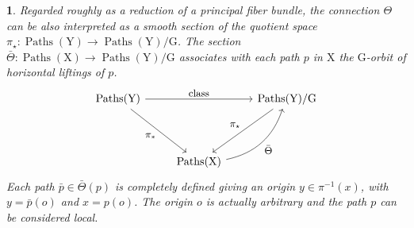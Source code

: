 \documentclass[12pt,reqno]{amsart}
\theoremstyle{article}
\newtheorem{article}{}
\def \G{\mathrm G}
\def \X{\mathrm X}
\def \Y{\mathrm Y}
\newcommand{\class}{\mathrm{class}}
\DeclareMathOperator{\Paths}{Paths}
\begin{document}
\begin{article}
    Regarded roughly as a reduction of a principal fiber bundle,
    the connection $\Theta$ can be also interpreted as a smooth section of the quotient space $\pi_\star \colon  \Paths(\Y) \to \Paths(\Y)/\G$.
    The section $\bar\Theta \colon \Paths(\X) \to \Paths(\Y)/\G$ associates with each path $p$ in $\X$ the $\G$-orbit of horizontal liftings of $p$.
    $$
    \begin{tikzcd}[column sep=normal,every label/.append style = {font = \small}]
      \Paths(\Y)  \arrow[rr, "\class"] \arrow[rd, swap, "\pi_*"] &    & \Paths(\Y)/\G \arrow[dl,swap, "\pi_\star"] \\[.75cm]
      & \Paths(\X) \arrow[bend right=30, swap, ur, "\bar\Theta"]  &
    \end{tikzcd}
    $$
    Each path $\bar p \in \bar\Theta(p)$ is completely defined giving an origin $y \in \pi^{-1}(x)$,
    with $y = \bar p(o)$ and $x = p(o)$.
    The origin $o$ is actually arbitrary and the path $p$ can be considered local.
  \end{article}
  
\end{document}
